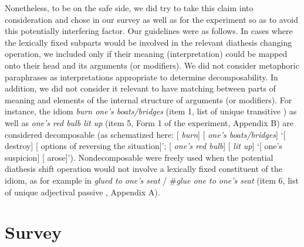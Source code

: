 \documentclass[output=paper]{langsci/langscibook}
\begin{document}
\begin{paperappendix}
Nonetheless, to be on the safe side, we did try to take this claim into
consideration and chose  in our survey as well as  for the
experiment so as to avoid this potentially interfering factor. Our guidelines
were as follows. In cases where the lexically fixed subparts would be involved
in the relevant diathesis changing operation, we included  only if their
meaning (interpretation) could be mapped onto their head and its arguments (or
modifiers). We did not consider metaphoric paraphrases as interpretations
appropriate to determine decomposability. In addition, we did not consider it
relevant to have matching between parts of meaning and elements of the internal
structure of arguments (or modifiers). For instance, the idiom \emph{burn
one’s boats/bridges} (item 1, list of unique transitive ) as well as
\emph{one’s red bulb lit up} (item 5, Form 1 of the experiment, Appendix B) are
considered decomposable (as schematized here: [ \emph{burn}] [
\emph{one’s boats/bridges}] ‘[ destroy] [ options of reversing
the situation]’; [ \emph{one’s red bulb}] [ \emph{lit up}]
‘[ one’s suspicion] [ arose]’). Nondecomposable  were
freely used when the potential diathesis shift operation would not involve a
lexically fixed constituent of the idiom, as for example in \emph{glued to
one’s seat} / \#\emph{glue one to one’s seat} (item 6, list of unique
adjectival passive , Appendix A).

\section{Survey}
\label{app-14:a}


\end{paperappendix}
\end{document}
